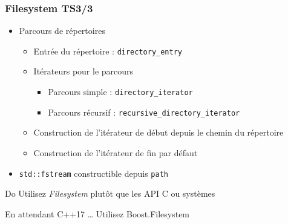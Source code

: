 \documentclass[C++.tex]{subfiles}
\begin{document}
\begin{frame}[fragile]
	\frametitle{Filesystem TS\titlehfill{}3/3}
	\begin{itemize}
		\item Parcours de répertoires
		\begin{itemize}
			\item Entrée du répertoire : \lstinline|directory_entry|
			\item Itérateurs pour le parcours
			\begin{itemize}
				\item Parcours simple : \lstinline|directory_iterator|
				\item Parcours récursif : \lstinline|recursive_directory_iterator|
			\end{itemize}
			\item Construction de l'itérateur de début depuis le chemin du répertoire
			\item Construction de l'itérateur de fin par défaut
		\end{itemize}
		\item \lstinline|std::fstream| constructible depuis \lstinline|path|
	\end{itemize}

	\begin{exampleblock}{Do}
		Utilisez \textit{Filesystem} plutôt que les API C ou systèmes
	\end{exampleblock}

	\begin{block}{En attendant C++17 \ldots}
		Utilisez Boost.Filesystem

	\end{block}
\end{frame}
\end{document}
